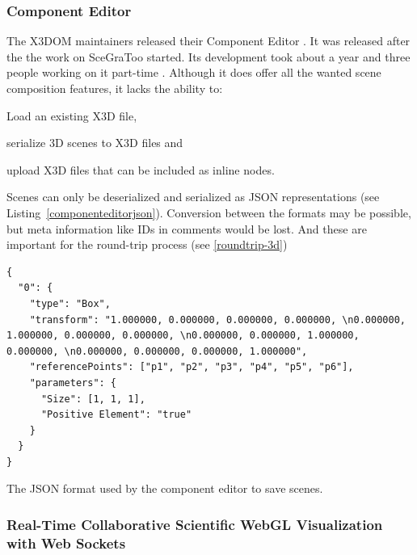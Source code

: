 \clearpage

\subsubsection{Component Editor}
\label{component-editor30}

The X3DOM maintainers released their Component Editor \cite{componenteditor}.
It was released after the the work on \gls{SceGraToo} started.
Its development took about a year and three people working on it part-time \cite{componenteditoreffort}.
Although it does offer all the wanted scene composition features, it lacks the ability to:

\begin{itemize*}
  \item Load an existing \gls{X3D} file,
  \item serialize 3D scenes to \gls{X3D} files and
  \item upload \gls{X3D} files that can be included as inline nodes.
\end{itemize*}

Scenes can only be deserialized and serialized as \gls{JSON} representations (see Listing~\ref{componenteditorjson}).
Conversion between the formats may be possible, but meta information like \glspl{ID} in comments would be lost.
And these are important for the round-trip process (see \ref{roundtrip-3d})

\begin{listing}
  \begin{verbatim}
{
  "0": {
    "type": "Box",
    "transform": "1.000000, 0.000000, 0.000000, 0.000000, \n0.000000, 1.000000, 0.000000, 0.000000, \n0.000000, 0.000000, 1.000000, 0.000000, \n0.000000, 0.000000, 0.000000, 1.000000",
    "referencePoints": ["p1", "p2", "p3", "p4", "p5", "p6"],
    "parameters": {
      "Size": [1, 1, 1],
      "Positive Element": "true"
    }
  }
}
  \end{verbatim}
  \caption{The \gls{JSON} format used by the component editor to save scenes.}
  \label{componenteditorjson}
\end{listing}

\subsubsection{Real-Time Collaborative Scientific WebGL Visualization with Web Sockets}
\label{rtcswvwws}

